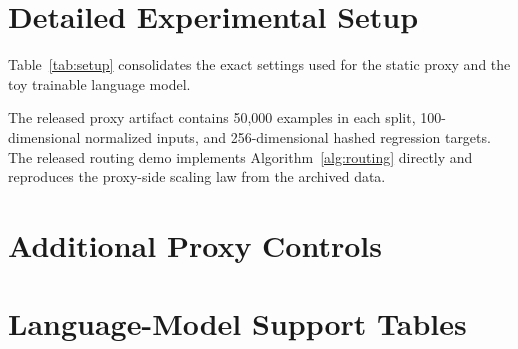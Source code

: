 \documentclass[10pt,letterpaper]{article}
\begin{document}



\clearpage
\appendix

\section{Detailed Experimental Setup}
\label{app:setup}
Table~\ref{tab:setup} consolidates the exact settings used for the static proxy and the toy trainable language model.

\begin{table}[H]
  \centering
  \caption{Exact settings for the experiments reported in the paper.}
  \label{tab:setup}
  \small
  
\end{table}

The released proxy artifact contains 50{,}000 examples in each split, 100-dimensional normalized inputs, and 256-dimensional hashed regression targets. The released routing demo implements Algorithm~\ref{alg:routing} directly and reproduces the proxy-side scaling law from the archived data.

\section{Additional Proxy Controls}
\label{app:proxy}
\begin{table}[H]
  \centering
  \caption{Structure-destroying proxy control. Column permutation weakens concentration even though marginal feature statistics are preserved.}
  \small
  
\end{table}

\begin{table}[H]
  \centering
  \caption{Adaptive Euclidean control. Fixed Hopf routing is more concentrated than adaptive $K$-means on the same structured proxy.}
  \small
  
\end{table}

\begin{table}[H]
  \centering
  \caption{Normalization robustness. The fitted Hopf exponent changes only minimally across L1, L2, L3, and L4 normalization variants, which supports the angular interpretation of the proxy result.}
  \small
  
\end{table}

\section{Language-Model Support Tables}
\label{app:lm}
\begin{table}[H]
  \centering
  \caption{Compact summary of the trainable null result.}
  \small
  
\end{table}
\end{document}
